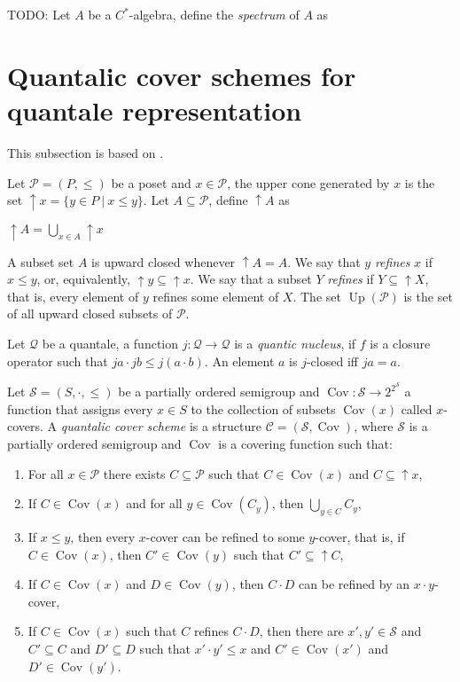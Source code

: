 \documentclass[a4paper]{article}
\theoremstyle{defin}
\theoremstyle{theorem}
\theoremstyle{claim}
\theoremstyle{prop}
\theoremstyle{lemma}
\theoremstyle{fact}
\theoremstyle{ex}
\theoremstyle{col}
\begin{document}
TODO: Let $A$ be a $C^*$-algebra, define the \emph{spectrum} of $A$ as

\section{Quantalic cover schemes for quantale representation}

This subsection is based on \cite{goldblatt2006kripke}.

Let $\mathcal{P} = (P, \leq)$ be a poset and $x \in \mathcal{P}$, the upper cone generated by $x$ is the set $\uparrow x = \{ y \in P \: | \: x \leq y \}$. Let $A \subseteq \mathcal{P}$, define $\uparrow A$ as
\begin{center}
$\uparrow A = \bigcup \limits_{x \in A} \uparrow x$
\end{center}
A subset set $A$ is upward closed whenever $\uparrow A = A$.
We say that $y$ \emph{refines} $x$ if $x \leq y$, or, equivalently, $\uparrow y \subseteq \uparrow x$. We say that a subset $Y$ \emph{refines} if $Y \subseteq \uparrow X$, that is, every element of $y$ refines some element of $X$. The set $\operatorname{Up}(\mathcal{P})$ is the set of all upward closed subsets of $\mathcal{P}$.

Let $\mathcal{Q}$ be a quantale, a function $j : \mathcal{Q} \to \mathcal{Q}$ is a \emph{quantic nucleus}, if $f$ is a closure operator such that $j a \cdot j b \leq j (a \cdot b)$. An element $a$ is $j$-closed iff $j a = a$.

Let $\mathcal{S} = (S, \cdot, \leq)$ be a partially ordered semigroup and $\operatorname{Cov} : \mathcal{S} \to 2^{2^{\mathcal{S}}}$ a function that assigns every $x \in S$ to the collection of subsets $\operatorname{Cov}(x)$ called $x$-covers. A \emph{quantalic cover scheme} is a structure $\mathcal{C} = (\mathcal{S}, \operatorname{Cov})$, where $\mathcal{S}$ is a partially ordered semigroup and $\operatorname{Cov}$ is a covering function such that:
\begin{enumerate}
\item For all $x \in \mathcal{P}$ there exists $C \subseteq \mathcal{P}$ such that $C \in \operatorname{Cov}(x)$ and $C \subseteq \uparrow x$,
\item If $C \in \operatorname{Cov}(x)$ and for all $y \in \operatorname{Cov}(C_y)$, then $\bigcup \limits_{y \in C} C_y$,
\item If $x \leq y$, then every $x$-cover can be refined to some $y$-cover, that is, if $C \in \operatorname{Cov}(x)$, then $C' \in \operatorname{Cov}(y)$ such that $C' \subseteq \uparrow C$,
\item If $C \in \operatorname{Cov}(x)$ and $D \in \operatorname{Cov}(y)$, then $C \cdot D$ can be refined by an $x \cdot y$-cover,
\item If $C \in \operatorname{Cov}(x)$ such that $C$ refines $C \cdot D$, then there are $x', y' \in \mathcal{S}$ and $C' \subseteq C$ and $D' \subseteq D$ such that $x' \cdot y' \leq x$ and $C' \in \operatorname{Cov}(x')$ and $D' \in \operatorname{Cov}(y')$.
\end{enumerate}
\end{document}
